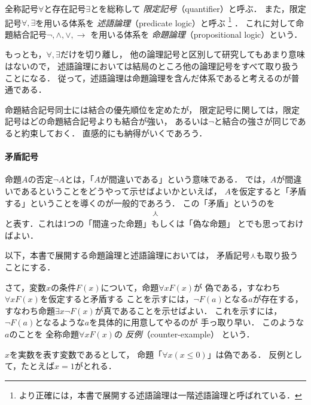   全称記号$\forall$と存在記号$\exists$とを総称して
  \emph{限定記号}（quantifier）と呼ぶ．
  また，限定記号$\forall,  \exists$を用いる体系を
  \emph{述語論理}（predicate logic）と呼ぶ
  \footnote{より正確には，本書で展開する述語論理は一階述語論理と呼ばれている．}
  ．
  これに対して命題結合記号$\lnot ,  \land ,  \lor ,  \to$
  を用いる体系を
  \emph{命題論理}（propositional logic）という．

  もっとも，$\forall ,  \exists$だけを切り離し，
  他の論理記号と区別して研究してもあまり意味はないので，
  述語論理においては結局のところ他の論理記号をすべて取り扱うことになる．
  従って，述語論理は命題論理を含んだ体系であると考えるのが普通である．

  命題結合記号同士には結合の優先順位を定めたが，
  限定記号に関しては，限定記号はどの命題結合記号よりも結合が強い，
  あるいは$\lnot$と結合の強さが同じであると約束しておく．
  直感的にも納得がいくであろう．

  
 \paragraph{矛盾記号}
  命題$A$の否定$\lnot A$とは，「$A$が間違いである」という意味である．
  では，$A$が間違いであるということをどうやって示せばよいかといえば，
  $A$を仮定すると「矛盾する」ということを導くのが一般的であろう．
  この「矛盾」というのを
  \begin{align}
    \curlywedge
    \label{eq:mujun}
  \end{align}
  と表す．これは1つの「間違った命題」もしくは「偽な命題」
  とでも思っておけばよい．

  以下，本書で展開する命題論理と述語論理においては，
  矛盾記号$\curlywedge$も取り扱うことにする．

  さて，変数$x$の条件$F(x)$について，命題$\forall x F(x)$が
  偽である，すなわち$\forall x F(x)$を仮定すると矛盾する
  ことを示すには，$\lnot F(a)$となる$a$が存在する，
  すなわち命題$\exists x \lnot F(x)$が真であることを示せばよい．
  これを示すには，$\lnot F (a)$となるような$a$を具体的に用意してやるのが
  手っ取り早い．
  このような$a$のことを
  全称命題$\forall x F(x)$の
  \emph{反例}（counter-example）
  という．

  \begin{ex}
    $x$を実数を表す変数であるとして，
    命題「$\forall x ( x \leq 0)$」は偽である．
    反例として，たとえば$x=1$がとれる．
  \end{ex}

